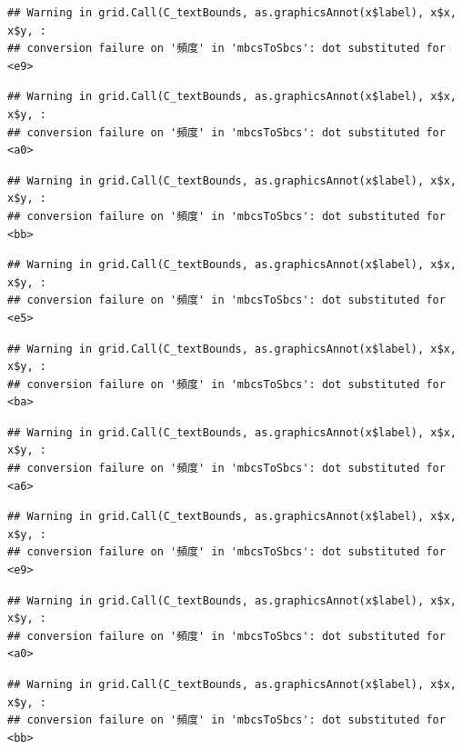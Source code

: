 \documentclass[
]{book}
\begin{document}
\begin{verbatim}
## Warning in grid.Call(C_textBounds, as.graphicsAnnot(x$label), x$x, x$y, :
## conversion failure on '頻度' in 'mbcsToSbcs': dot substituted for <e9>
\end{verbatim}

\begin{verbatim}
## Warning in grid.Call(C_textBounds, as.graphicsAnnot(x$label), x$x, x$y, :
## conversion failure on '頻度' in 'mbcsToSbcs': dot substituted for <a0>
\end{verbatim}

\begin{verbatim}
## Warning in grid.Call(C_textBounds, as.graphicsAnnot(x$label), x$x, x$y, :
## conversion failure on '頻度' in 'mbcsToSbcs': dot substituted for <bb>
\end{verbatim}

\begin{verbatim}
## Warning in grid.Call(C_textBounds, as.graphicsAnnot(x$label), x$x, x$y, :
## conversion failure on '頻度' in 'mbcsToSbcs': dot substituted for <e5>
\end{verbatim}

\begin{verbatim}
## Warning in grid.Call(C_textBounds, as.graphicsAnnot(x$label), x$x, x$y, :
## conversion failure on '頻度' in 'mbcsToSbcs': dot substituted for <ba>
\end{verbatim}

\begin{verbatim}
## Warning in grid.Call(C_textBounds, as.graphicsAnnot(x$label), x$x, x$y, :
## conversion failure on '頻度' in 'mbcsToSbcs': dot substituted for <a6>
\end{verbatim}

\begin{verbatim}
## Warning in grid.Call(C_textBounds, as.graphicsAnnot(x$label), x$x, x$y, :
## conversion failure on '頻度' in 'mbcsToSbcs': dot substituted for <e9>
\end{verbatim}

\begin{verbatim}
## Warning in grid.Call(C_textBounds, as.graphicsAnnot(x$label), x$x, x$y, :
## conversion failure on '頻度' in 'mbcsToSbcs': dot substituted for <a0>
\end{verbatim}

\begin{verbatim}
## Warning in grid.Call(C_textBounds, as.graphicsAnnot(x$label), x$x, x$y, :
## conversion failure on '頻度' in 'mbcsToSbcs': dot substituted for <bb>
\end{verbatim}
\end{document}
